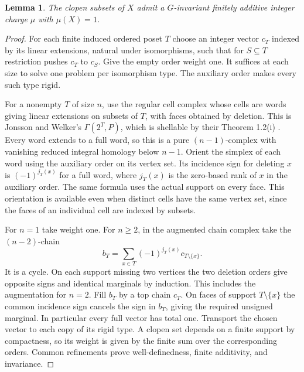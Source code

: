 \documentclass[11pt]{article}
\newtheorem{lemma}[theorem]{Lemma}
\begin{document}
\begin{lemma}\label{charge}
The clopen subsets of $X$ admit a $G$-invariant finitely additive integer charge $\mu$ with $\mu(X)=1$.
\end{lemma}
\begin{proof}
For each finite induced ordered poset $T$ choose an integer vector $c_T$ indexed by its linear extensions, natural under isomorphisms, such that for $S\subseteq T$ restriction pushes $c_T$ to $c_S$. Give the empty order weight one. It suffices at each size to solve one problem per isomorphism type. The auxiliary order makes every such type rigid.

For a nonempty $T$ of size $n$, use the regular cell complex whose cells are words giving linear extensions on subsets of $T$, with faces obtained by deletion. This is Jonsson and Welker's $\Gamma(2^T,P)$, which is shellable by their Theorem 1.2(i) \cite{jw}. Every word extends to a full word, so this is a pure $(n-1)$-complex with vanishing reduced integral homology below $n-1$. Orient the simplex of each word using the auxiliary order on its vertex set. Its incidence sign for deleting $x$ is $(-1)^{j_T(x)}$ for a full word, where $j_T(x)$ is the zero-based rank of $x$ in the auxiliary order. The same formula uses the actual support on every face. This orientation is available even when distinct cells have the same vertex set, since the faces of an individual cell are indexed by subsets.

For $n=1$ take weight one. For $n\geq2$, in the augmented chain complex take the $(n-2)$-chain
\[
  b_T=\sum_{x\in T}(-1)^{j_T(x)}c_{T\setminus\{x\}}.
\]
It is a cycle. On each support missing two vertices the two deletion orders give opposite signs and identical marginals by induction. This includes the augmentation for $n=2$. Fill $b_T$ by a top chain $c_T$. On faces of support $T\setminus\{x\}$ the common incidence sign cancels the sign in $b_T$, giving the required unsigned marginal. In particular every full vector has total one. Transport the chosen vector to each copy of its rigid type. A clopen set depends on a finite support by compactness, so its weight is given by the finite sum over the corresponding orders. Common refinements prove well-definedness, finite additivity, and invariance.
\end{proof}
\end{document}

